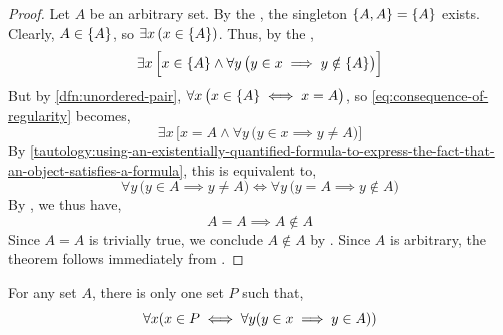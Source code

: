 \begin{proof}
    Let \( A \) be an arbitrary set. By the , the singleton \( \mleft\{ A,A \mright\} = \mleft\{ A \mright\} \)
    exists. Clearly, \( A \in \mleft\{ A \mright\} \), so \( \exists x \, \mleft( x \in \mleft\{ A \mright\} \mright) \).
    Thus, by the ,
    \begin{equation}
        \label{eq:consequence-of-regularity}
        \exists x \, \Big[ x \in \mleft\{ A \mright\} \land \forall y \, \big( y \in x \implies y \notin \mleft\{ A \mright\} \big) \Big]
    \end{equation}
    But by \cref{dfn:unordered-pair}, \( \forall x \, \big( x \in \mleft\{ A \mright\} \iff x = A \big) \), so \eqref{eq:consequence-of-regularity}
    becomes,
    \begin{equation*}
        \exists x \, \Big[ x = A \land \forall y \, \big( y \in x \implies y \neq A \big) \Big]
    \end{equation*}
    By \cref{tautology:using-an-existentially-quantified-formula-to-express-the-fact-that-an-object-satisfies-a-formula}, this is equivalent to,
    \begin{equation*}
        \forall y \, \big( y \in A \implies y \neq A \big) \iff \forall y \, \big( y = A \implies y \notin A \big)
    \end{equation*}
    By , we thus have,
    \begin{equation*}
        A = A \implies A \notin A
    \end{equation*}
    Since \( A = A \) is trivially true, we conclude \( A \notin A \) by . Since \( A \) is arbitrary, the theorem follows immediately
    from .
\end{proof}

\begin{thm}
    \label{thm:uniqueness-power-set}
    For any set \( A \), there is only one set \( P \) such that,
    \begin{equation*}
        \forall x \mleft( x \in P
        \iff \forall y \mleft( y \in x \implies y \in A \mright) \mright)
    \end{equation*}
\end{thm}

